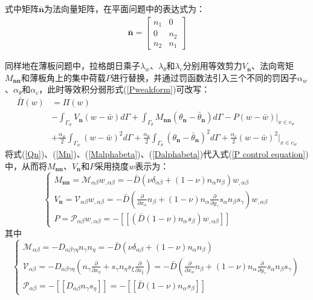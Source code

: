 式中矩阵$\bar{\pmb{n}}$为法向量矩阵，在平面问题中的表达式为：
\begin{equation}
\begin{split}
    \bar{\pmb n}=\begin{bmatrix}n_1&0\\0&n_2\\n_2&n_1
    \end{bmatrix}
\end{split}
\end{equation}\par
同样地在薄板问题中，拉格朗日乘子$\lambda_w$、$\lambda_\theta$和$\lambda_c$分别用等效剪力$V_{\pmb n}$、法向弯矩$M_{\pmb{nn}}$和薄板角上的集中荷载$P$进行替换，并通过罚函数法引入三个不同的罚因子$\alpha_w$、$\alpha_\theta$和$\alpha_c$，此时等效积分弱形式(\ref{Pweakform})可改写：
\begin{equation}\label{Pnitsche}
\begin{split}
    \bar{\Pi}(w)&=\Pi(w)\\
    &-\int_{\Gamma_w}V_{\pmb{n}}(w-\bar{w})d\Gamma+\int_{\Gamma_{\theta}}M_{\pmb{nn}}(\theta_{\pmb{n}}-\bar{\theta}_{\pmb{n}})d\Gamma-P(w-\bar{w})\vert_{x\in c_w}\\
    &+\frac{\alpha_w}{2}\int_{\Gamma_w}(w-\bar{w})^2d\Gamma+\frac{\alpha_{\theta}}{2}\int_{\Gamma_{\theta}}(\theta_{\pmb{n}}-\bar{\theta}_{\pmb{n}})^2d\Gamma+\frac{\alpha_c}{2}(w-\bar{w})^2\vert_{x\in c_w}
\end{split}
\end{equation}
将式(\ref{Qn})、(\ref{Mn})、(\ref{Malphabeta})、(\ref{Dalphabeta})代入式(\ref{P control equation})中，从而将$M_{\pmb{nn}}$、$V_{\pmb n}$和$P$采用挠度$w$表示为：
\begin{equation}
\begin{cases}\label{MVP}
        M_{\pmb{nn}}=\mathcal{M}_{\alpha\beta}w_{,\alpha\beta}=-\bar{D}(\nu\delta_{\alpha\beta}+(1-\nu)n_{\alpha}n_{\beta})w_{,\alpha\beta}\\
        V_{\pmb{n}}=\mathcal{V}_{\alpha\beta}w_{,\alpha\beta}=-\bar{D}(\frac{\partial}{\partial x_{\alpha}}n_{\beta}+(1-\nu)n_{\alpha}\frac{\partial}{\partial y_{\gamma}}s_{\alpha}n_{\beta}s_{\gamma})w_{,\alpha\beta}\\
        P=\mathcal{P}_{\alpha\beta}w_{,\alpha\beta}=-[[(\bar{D}(1-\nu)n_{\alpha}s_{\beta})w_{,\alpha\beta}]]
\end{cases}
\end{equation}
其中
\begin{equation}
\begin{cases}\label{MVP1}
 \mathcal{M}_{\alpha\beta}=-D_{\alpha\beta\gamma\eta}n_{\gamma}n_{\eta}=-\bar{D}(\nu\delta_{\alpha\beta}+(1-\nu)n_{\alpha}n_{\beta})\\
  \mathcal{V}_{\alpha\beta}=-D_{\alpha\beta\gamma\eta}(n_{\gamma}\frac{\partial}{\partial x_{\eta}}+s_{\gamma}n_{\eta}s_{\xi}\frac{\partial}{\partial x_{\xi}})
  =-\bar{D}(\frac{\partial}{\partial x_{\alpha}}n_{\beta}+(1-\nu)n_{\alpha}\frac{\partial}{\partial y_{\gamma}}s_{\alpha}n_{\beta}s_{\gamma})\\
 \mathcal{P}_{\alpha\beta}=-[[D_{\alpha\beta}n_{\gamma}s_{\eta}]]=-[[\bar{D}(1-\nu)n_{\alpha}s_{\beta}]]
\end{cases}
\end{equation}\par
